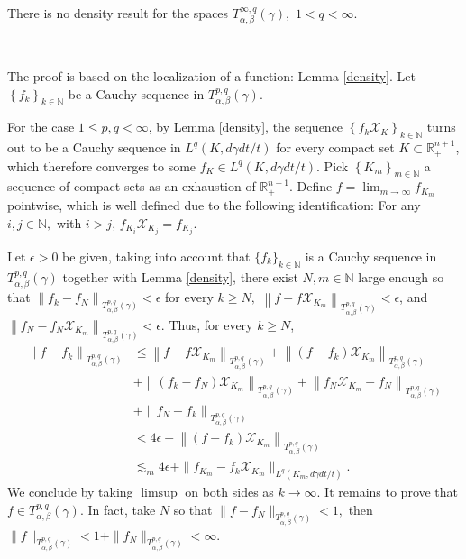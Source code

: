 \documentclass[leqno,11pt]{amsart}
\theoremstyle{plain}
\theoremstyle{remark}
\begin{document}
{{{There is no density result for the spaces $T^{\infty,q}_{\alpha, \beta}(\gamma),$ $1<q<\infty.$

 \

 
The proof is based on the localization of a function: Lemma \ref{density}. Let $\left\{f_k\right\}_{k \in \mathbb{N}}$ be a Cauchy sequence in $T_{\alpha, \beta}^{p,q}(\gamma)$.

For the case $1 \le p, q<\infty$, by Lemma \ref{density}, the sequence $\left\{f_k \mathcal{X}_{K}\right\}_{k \in \mathbb{N}}$ turns out to be a Cauchy sequence in $L^q(K, d\gamma dt/t)$ for every compact set $K \subset \mathbb{R}_{+}^{n+1}$, which therefore converges to some $f_K \in L^q(K, d\gamma dt/t)$. Pick $\left\{K_m\right\}_{m \in \mathbb{N}}$ a sequence of compact sets as an exhaustion of $\mathbb{R}_{+}^{n+1}$. Define $f=\lim _{m \rightarrow \infty} f_{K_m}$ pointwise, which is well defined due to the following identification: For any $i, j \in \mathbb{N},$ with $i>j$, $f_{K_i} \mathcal{X}_{K_j}=f_{K_j}$. 

Let $\epsilon>0$ be given, taking into account that $\{f_k\}_{k\in {\mathbb N}}$ is a Cauchy sequence in $T^{p,q}_{\alpha, \beta}(\gamma)$ together with Lemma \ref{density}, there exist $N, m \in \mathbb{N}$ large enough so that $\left\|f_k-f_N\right\|_{T_{\alpha, \beta}^{p,q}(\gamma)}<\epsilon$ for every $k \geq N,$ $\left\|f-f \mathcal{X}_{K_m}\right\|_{T_{\alpha,\beta}^{p, q}(\gamma)}<\epsilon$, and $\left\|f_N-f_N \mathcal{X}_{K_m}\right\|_{T_{\alpha, \beta}^{p,q}(\gamma)}<\epsilon$. Thus, for every $k \geq N$,
\begin{align*}
\left\|f-f_k\right\|_{T_{\alpha, \beta}^{p,q}(\gamma)} & \leq\left\|f-f \mathcal{X}_{K_m}\right\|_{T_{\alpha, \beta}^{p,q}(\gamma)}+\left\|\left(f-f_k\right)
\mathcal{X}_{K_m}\right\|_{T_{\alpha, \beta}^{p,q}(\gamma)}\\
& +\left\|\left(f_k-f_N\right) \mathcal{X}_{K_m}\right\|_{T_{\alpha, \beta}^{p,q}(\gamma)}  +\left\|f_N \mathcal{X}_{K_m}-f_N\right\|_{T_{\alpha, \beta}^{p,q}(\gamma)}\\
&+ \left\|f_N-f_k\right\|_{T_{\alpha, \beta}^{p,q}(\gamma)} \\
& <4 \epsilon+\left\|\left(f-f_k\right) \mathcal{X}_{K_m}\right\|_{T_{\alpha, \beta}^{p,q}(\gamma)}\\ & \lesssim_m  4\epsilon+ \|f_{K_m}-f_k\mathcal{X}_{K_m}\|_{L^q(K_m, d\gamma dt/t)}.
\end{align*}
We conclude by taking $\limsup$ on both sides as $k\to \infty$. It remains to prove that $f \in T_{\alpha, \beta}^{p,q}(\gamma)$. In fact,
take $N$ so that $\|f-f_N\|_{T^{p,q}_{\alpha,\beta}(\gamma)}<1,$ then $\|f\|_{T^{p,q}_{\alpha,\beta}(\gamma)}<1+\|f_N\|_{T^{p,q}_{\alpha,\beta}(\gamma)}<\infty.$
 

}}}
\end{document}
